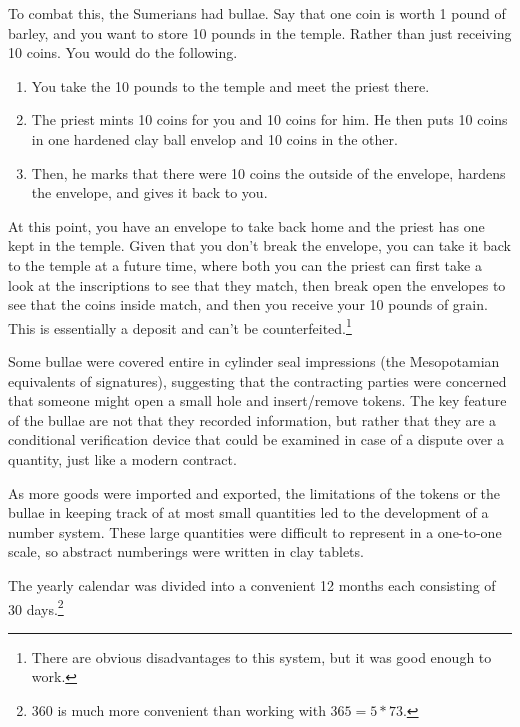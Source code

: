 \documentclass{article}
\begin{document}
    \begin{finance}
      To combat this, the Sumerians had bullae. Say that one coin is worth 1 pound of barley, and you want to store 10 pounds in the temple. Rather than just receiving 10 coins. You would do the following. 
      \begin{enumerate}
        \item You take the 10 pounds to the temple and meet the priest there. 
        \item The priest mints 10 coins for you and 10 coins for him. He then puts 10 coins in one hardened clay ball envelop and 10 coins in the other.  
        \item Then, he marks that there were 10 coins the outside of the envelope, hardens the envelope, and gives it back to you. 
      \end{enumerate}
      At this point, you have an envelope to take back home and the priest has one kept in the temple. Given that you don't break the envelope, you can take it back to the temple at a future time, where both you can the priest can first take a look at the inscriptions to see that they match, then break open the envelopes to see that the coins inside match, and then you receive your 10 pounds of grain. This is essentially a deposit and can't be counterfeited.\footnote{There are obvious disadvantages to this system, but it was good enough to work. } 
    \end{finance} 

    Some bullae were covered entire in cylinder seal impressions (the Mesopotamian equivalents of signatures), suggesting that the contracting parties were concerned that someone might open a small hole and insert/remove tokens. The key feature of the bullae are not that they recorded information, but rather that they are a conditional verification device that could be examined in case of a dispute over a quantity, just like a modern contract. 

    \begin{technology}
      As more goods were imported and exported, the limitations of the tokens or the bullae in keeping track of at most small quantities led to the development of a number system. These large quantities were difficult to represent in a one-to-one scale, so abstract numberings were written in clay tablets. 
    \end{technology}

    \begin{technology}
      The yearly calendar was divided into a convenient 12 months each consisting of 30 days.\footnote{360 is much more convenient than working with $365 = 5 * 73$. } 
    \end{technology}
\end{document}
